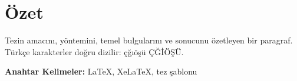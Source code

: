 \chapter*{Özet}

Tezin amacını, yöntemini, temel bulgularını ve sonucunu özetleyen bir
paragraf. Türkçe karakterler doğru dizilir: çğıöşü ÇĞİÖŞÜ.

\vspace{1em}
\noindent\textbf{Anahtar Kelimeler:} LaTeX, XeLaTeX, tez şablonu
